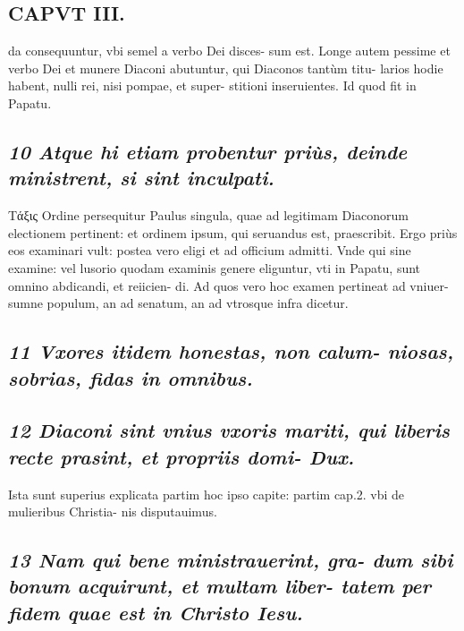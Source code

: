 \documentclass{article}
\begin{document}
\begin{pages}
\section*{CAPVT  III. }
\marginpar{[ p.165 ]}\pstart da consequuntur, vbi semel a verbo Dei disces- sum est.  \pend\pstart Longe autem pessime et verbo Dei et munere Diaconi abutuntur, qui Diaconos tantùm titu- larios hodie habent, nulli rei, nisi pompae, et super- stitioni inseruientes. Id quod fit in Papatu.  \pend
{}
{}
\subsection*{\textit{10 Atque hi etiam probentur priùs, deinde ministrent, si sint inculpati. }}\pstart Τάξις Ordine persequitur Paulus singula, quae ad legitimam Diaconorum electionem pertinent: et ordinem ipsum, qui seruandus est, praescribit. Ergo priùs eos examinari vult: postea vero eligi et ad officium admitti. Vnde qui sine examine: vel lusorio quodam examinis genere eliguntur, vti in Papatu, sunt omnino abdicandi, et reiicien- di. Ad quos vero hoc examen pertineat ad vniuer- sumne populum, an ad senatum, an ad vtrosque infra dicetur.  \pend
{}
{}
\subsection*{\textit{11 Vxores itidem honestas, non calum- niosas, sobrias, fidas in omnibus. }}
{}
\subsection*{\textit{12 Diaconi sint vnius vxoris mariti, qui liberis recte prasint, et propriis domi- Dux. }}\pstart Ista sunt superius explicata partim hoc ipso capite: partim cap.2. vbi de mulieribus Christia- nis disputauimus.  \pend
{}
{}
\subsection*{\textit{13 Nam qui bene ministrauerint, gra- dum sibi bonum acquirunt, et multam liber- tatem per fidem quae est in Christo Iesu. }}

\end{pages}
\end{document}
